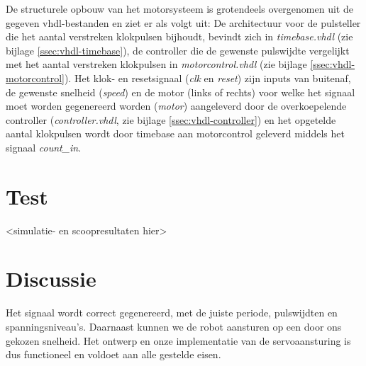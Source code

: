 \documentclass{report}
\begin{document}
De structurele opbouw van het motorsysteem is grotendeels overgenomen uit de gegeven vhdl-bestanden en ziet er als volgt uit:
De architectuur voor de pulsteller die het aantal verstreken klokpulsen bijhoudt, bevindt zich in \textit{timebase.vhdl} (zie bijlage \ref{ssec:vhdl-timebase}), de controller die de gewenste pulswijdte vergelijkt met het aantal verstreken klokpulsen in \textit{motorcontrol.vhdl} (zie bijlage \ref{ssec:vhdl-motorcontrol}). Het klok- en resetsignaal (\textit{clk} en \textit{reset}) zijn inputs van buitenaf, de gewenste snelheid (\textit{speed}) en de motor (links of rechts) voor welke het signaal moet worden gegenereerd worden (\textit{motor}) aangeleverd door de overkoepelende controller (\textit{controller.vhdl}, zie bijlage \ref{ssec:vhdl-controller}) en het opgetelde aantal klokpulsen wordt door timebase aan motorcontrol geleverd middels het signaal \textit{count\_in}.

\section{Test}
\label{sec:servo-test}

<simulatie- en scoopresultaten hier>

\section{Discussie}
\label{sec:servo-disc}

Het signaal wordt correct gegenereerd, met de juiste periode, pulswijdten en spanningsniveau's. Daarnaast kunnen we de robot aansturen op een door ons gekozen snelheid. Het ontwerp en onze implementatie van de servoaansturing is dus functioneel en voldoet aan alle gestelde eisen.
\end{document}
